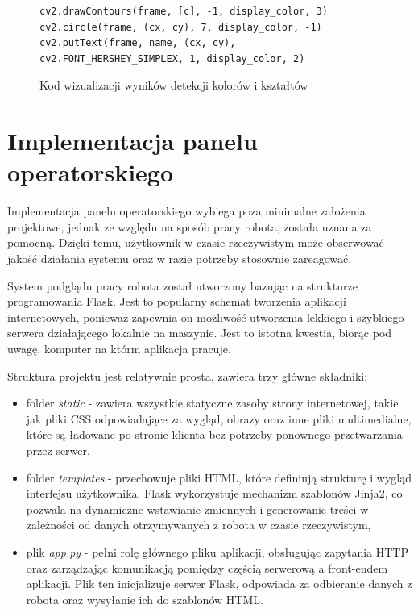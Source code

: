 \begin{figure}[H]
  \centering
  \begin{lstlisting}
cv2.drawContours(frame, [c], -1, display_color, 3)
cv2.circle(frame, (cx, cy), 7, display_color, -1)
cv2.putText(frame, name, (cx, cy), cv2.FONT_HERSHEY_SIMPLEX, 1, display_color, 2)
  \end{lstlisting}
  \caption{Kod wizualizacji wyników detekcji kolorów i kształtów}
  \label{fig:visualization}
\end{figure}

\section{Implementacja panelu operatorskiego}

Implementacja panelu operatorskiego wybiega poza minimalne założenia projektowe, jednak ze względu na sposób pracy robota, została uznana za pomocną. Dzięki temu, użytkownik w czasie rzeczywistym może obserwować jakość działania systemu oraz w razie potrzeby stosownie zareagować. 

System podglądu pracy robota został utworzony bazując na strukturze programowania Flask. Jest to popularny schemat tworzenia aplikacji internetowych, ponieważ zapewnia on możliwość utworzenia lekkiego i szybkiego serwera działającego lokalnie na maszynie. Jest to istotna kwestia, biorąc pod uwagę, komputer na którm aplikacja pracuje. 

Struktura projektu jest relatywnie prosta, zawiera trzy główne składniki:
\begin{itemize}
  \item folder \textit{static} - zawiera wszystkie statyczne zasoby strony internetowej, takie jak pliki CSS odpowiadające za wygląd, obrazy oraz inne pliki multimedialne, które są ładowane po stronie klienta bez potrzeby ponownego przetwarzania przez serwer,
  \item folder \textit{templates} - przechowuje pliki HTML, które definiują strukturę i wygląd interfejsu użytkownika. Flask wykorzystuje mechanizm szablonów Jinja2, co pozwala na dynamiczne wstawianie zmiennych i generowanie treści w zależności od danych otrzymywanych z robota w czasie rzeczywistym,
  \item plik \textit{app.py} -  pełni rolę głównego pliku aplikacji, obsługując zapytania HTTP oraz zarządzając komunikacją pomiędzy częścią serwerową a front-endem aplikacji. Plik ten inicjalizuje serwer Flask, odpowiada za odbieranie danych z robota oraz wysyłanie ich do szablonów HTML.
\end{itemize} 
